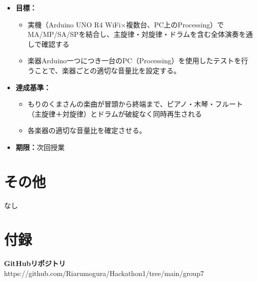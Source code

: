 \documentclass[uplatex,dvipdfmx]{jlreq}
\begin{document}
\begin{itemize}
    \item \textbf{目標：}
    \begin{itemize}
        \item 実機（Arduino UNO R4 WiFi×複数台、PC上のProcessing）でMA/MP/SA/SPを結合し、主旋律・対旋律・ドラムを含む全体演奏を通しで確認する
        \item 楽器Arduino一つにつき一台のPC（Processing）を使用したテストを行うことで、楽器ごとの適切な音量比を設定する。
    \end{itemize}
    \item \textbf{達成基準：}
    \begin{itemize}
        \item もりのくまさんの楽曲が冒頭から終端まで、ピアノ・木琴・フルート（主旋律＋対旋律）とドラムが破綻なく同時再生される
        \item 各楽器の適切な音量比を確定させる。
    \end{itemize}
    \item \textbf{期限：}次回授業
\end{itemize}

\section{その他}

なし

\section{付録}

\textbf{GitHubリポジトリ}
https://github.com/Riarumogura/Hackathon1/tree/main/group7
\end{document}
